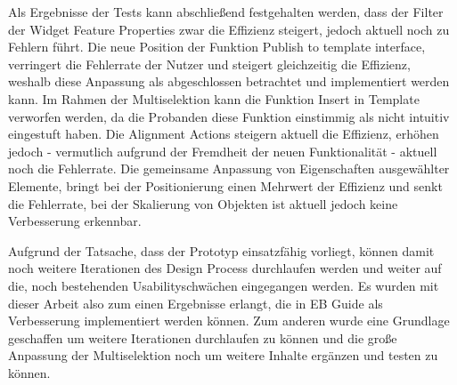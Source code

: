 Als Ergebnisse der Tests kann abschließend festgehalten werden, dass der Filter der \glqq Widget Feature Properties\grqq{} zwar die Effizienz steigert, jedoch aktuell noch zu Fehlern führt.
Die neue Position der Funktion \glqq Publish to template interface\grqq{}, verringert die Fehlerrate der Nutzer und steigert gleichzeitig die Effizienz, weshalb diese Anpassung als abgeschlossen betrachtet und implementiert werden kann.
Im Rahmen der Multiselektion kann die Funktion \glqq Insert in Template\grqq{} verworfen werden, da die Probanden diese Funktion einstimmig als nicht intuitiv eingestuft haben.
Die \glqq Alignment Actions\grqq{} steigern aktuell die Effizienz, erhöhen jedoch - vermutlich aufgrund der Fremdheit der neuen Funktionalität - aktuell noch die Fehlerrate.
Die gemeinsame Anpassung von Eigenschaften ausgewählter Elemente, bringt bei der Positionierung einen Mehrwert der Effizienz und senkt die Fehlerrate, bei der Skalierung von Objekten ist aktuell jedoch keine Verbesserung erkennbar.

Aufgrund der Tatsache, dass der Prototyp einsatzfähig vorliegt, können damit noch weitere Iterationen des Design Process durchlaufen werden und weiter auf die, noch bestehenden Usabilityschwächen eingegangen werden.
Es wurden mit dieser Arbeit also zum einen Ergebnisse erlangt, die in EB Guide als Verbesserung implementiert werden können.
Zum anderen wurde eine Grundlage geschaffen um weitere Iterationen durchlaufen zu können und die große Anpassung der Multiselektion noch um weitere Inhalte ergänzen und testen zu können.
